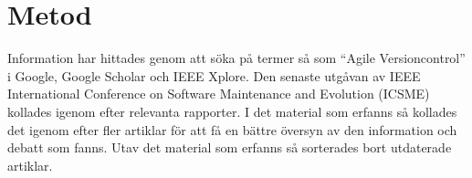 \section{Metod}
\label{sec:bjorn-method}

Information har hittades genom att söka på termer så som ``Agile Versioncontrol'' i Google, Google Scholar och IEEE Xplore. Den senaste utgåvan av IEEE International Conference on Software Maintenance and Evolution (ICSME) kollades igenom efter relevanta rapporter. I det material som erfanns så kollades det igenom efter fler artiklar för att få en bättre översyn av den information och debatt som fanns. Utav det material som erfanns så sorterades bort utdaterade artiklar.